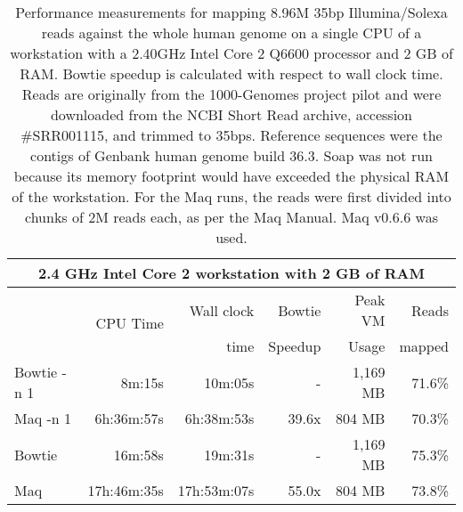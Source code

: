 \documentclass[letterpaper]{article}
\begin{document}
\begin{table}[tp]
\scriptsize
\begin{tabular}{lrrrrr}
\multicolumn{6}{c}{\small{2.4 GHz Intel Core 2 workstation with 2 GB of RAM}}\\[3pt]
\toprule
 & \multirow{2}{*}{CPU Time} & Wall clock & Bowtie  & Peak VM & Reads  \\
 &                            & time       & Speedup & Usage   & mapped \\[3pt]
\toprule
Bowtie -n 1 & 8m:15s & 10m:05s & - & 1,169 MB & 71.6\%\\\midrule
Maq -n 1 & 6h:36m:57s & 6h:38m:53s & 39.6x & 804 MB & 70.3\%\\\midrule
\midrule
Bowtie & 16m:58s & 19m:31s & - & 1,169 MB & 75.3\%\\\midrule
Maq & 17h:46m:35s & 17h:53m:07s & 55.0x & 804 MB & 73.8\%\\
\bottomrule
\end{tabular}
\caption{Performance measurements for mapping 8.96M 35bp Illumina/Solexa reads against the whole human genome on a single CPU of a workstation with a 2.40GHz Intel Core 2 Q6600 processor and 2 GB of RAM. Bowtie speedup is calculated with respect to wall clock time. Reads are originally from the 1000-Genomes project pilot and were downloaded from the NCBI Short Read archive, accession \#SRR001115, and trimmed to 35bps. Reference sequences were the contigs of Genbank human genome build 36.3. Soap was not run because its memory footprint would have exceeded the physical RAM of the workstation. For the Maq runs, the reads were first divided into chunks of 2M reads each, as per the Maq Manual. Maq v0.6.6 was used. }
\end{table}
\end{document}
